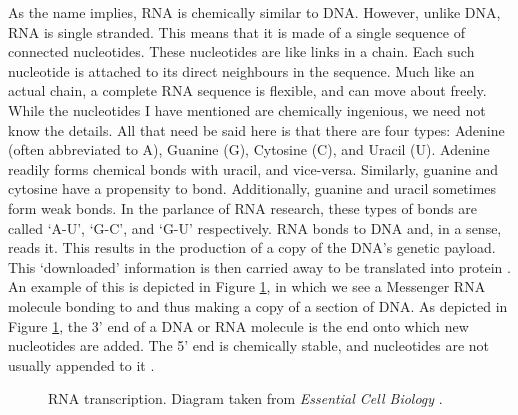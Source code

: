 \documentclass{cshonours}
\begin{document}
As the name implies, RNA is chemically similar to DNA. However, unlike DNA, RNA is single stranded. This means that it is made of a single sequence of connected nucleotides. These nucleotides are like links in a chain. Each such nucleotide is attached to its direct neighbours in the sequence. Much like an actual chain, a complete RNA sequence is flexible, and can move about freely. While the nucleotides I have mentioned are chemically ingenious, we need not know the details. All that need be said here is that there are four types: Adenine (often abbreviated to A), Guanine (G), Cytosine (C), and Uracil (U). Adenine readily forms chemical bonds with uracil, and vice-versa. Similarly, guanine and cytosine have a propensity to bond. Additionally, guanine and uracil sometimes form weak bonds. In the parlance of RNA research, these types of bonds are called `A-U', `G-C', and `G-U' respectively. RNA bonds to DNA and, in a sense, reads it. This results in the production of a copy of the DNA's genetic payload. This `downloaded' information is then carried away to be translated into protein \cite{albertsessential}. An example of this is depicted in Figure \ref{transcription}, in which we see a Messenger RNA molecule bonding to and thus making a copy of a section of DNA. As depicted in Figure \ref{transcription}, the 3' end of a DNA or RNA molecule is the end onto which new nucleotides are added. The 5' end is chemically stable, and nucleotides are not usually appended to it \cite{albertsessential}.

\begin{figure}
\begin{center}
\end{center}
\caption{RNA transcription. Diagram taken from \emph{Essential Cell Biology} \cite{albertsessential}.}
\label{transcription}
\end{figure}
\end{document}

